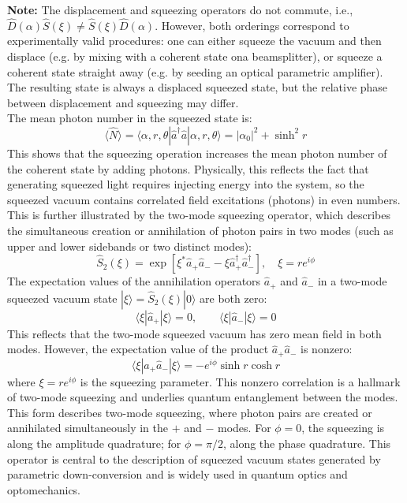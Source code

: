 \noindent \textbf{Note:}  The displacement and squeezing operators do not commute, i.e., $\hat{D}(\alpha)\hat{S}(\xi) \neq \hat{S}(\xi)\hat{D}(\alpha)$. However, both orderings correspond to experimentally valid procedures: one can either squeeze the vacuum and then displace (e.g. by mixing with a coherent state ona beamsplitter), or squeeze a coherent state straight away (e.g. by seeding an optical parametric amplifier). The resulting state is always a displaced squeezed state, but the relative phase between displacement and squeezing may differ. \\

The mean photon number in the squeezed state is: 
\begin{equation}
\langle \hat{N} \rangle = \langle \alpha, r, \theta | \hat{a}^\dagger \hat{a} | \alpha, r, \theta \rangle = |\alpha_0|^2 + \sinh^2 r 
\end{equation}
This shows that the squeezing operation increases the mean photon number of the coherent state by adding photons. Physically, this reflects the fact that generating squeezed light requires injecting energy into the system, so the squeezed vacuum contains correlated field excitations (photons) in even numbers. This is further illustrated by the two-mode squeezing operator, which describes the simultaneous creation or annihilation of photon pairs in two modes (such as upper and lower sidebands or two distinct modes):
\begin{equation}
\hat{S}_2(\xi) = \exp\left[ \xi^* \hat{a}_{+} \hat{a}_{-} - \xi \hat{a}_{+}^\dagger \hat{a}_{-}^\dagger \right], \quad \xi = r e^{i\phi}
\end{equation}
The expectation values of the annihilation operators $\hat{a}_{+}$ and $\hat{a}_{-}$ in a two-mode squeezed vacuum state $|\xi\rangle = \hat{S}_2(\xi)|0\rangle$ are both zero:
\begin{equation}
\langle \xi | \hat{a}_{+} | \xi \rangle = 0, \qquad \langle \xi | \hat{a}_{-} | \xi \rangle = 0
\end{equation}
This reflects that the two-mode squeezed vacuum has zero mean field in both modes. However, the expectation value of the product $\hat{a}_{+} \hat{a}_{-}$ is nonzero:
\begin{equation}
\langle \xi | \hat{a}_{+} \hat{a}_{-} | \xi \rangle = -e^{i\phi} \sinh r \cosh r
\end{equation}
where $\xi = r e^{i\phi}$ is the squeezing parameter. This nonzero correlation is a hallmark of two-mode squeezing and underlies quantum entanglement between the modes.
This form describes two-mode squeezing, where photon pairs are created or annihilated simultaneously in the $+$ and $-$ modes. For $\phi = 0$, the squeezing is along the amplitude quadrature; for $\phi = \pi/2$, along the phase quadrature. This operator is central to the description of squeezed vacuum states generated by parametric down-conversion and is widely used in quantum optics and optomechanics.

